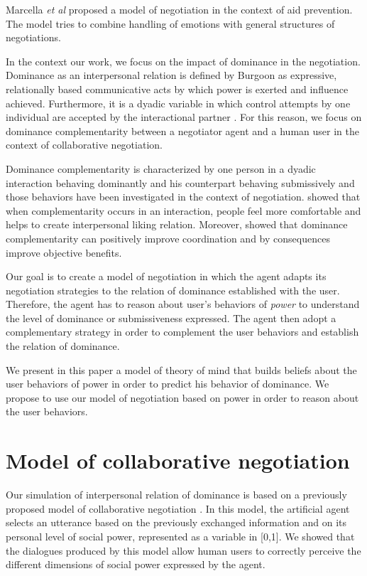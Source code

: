 \documentclass[sigconf]{aamas}  %
\begin{document}
	Marcella \textit{et al} \cite{klatt2011negotiations} proposed a model of negotiation in the context of aid prevention. The model tries to combine handling of emotions with general structures of negotiations. 
	
	In the context our work, we focus on the impact of dominance in the negotiation. Dominance as an interpersonal relation is defined by Burgoon \cite{burgoon1998nature} as expressive, relationally based communicative acts by which power is exerted and influence achieved. Furthermore, it is a dyadic variable in which control attempts by one individual are accepted by the
	interactional partner \cite{dunbar2005perceptions}. For this reason, we focus on dominance complementarity between a negotiator agent and a human user in the context of collaborative negotiation. 
	
	Dominance complementarity is characterized by one person in a dyadic interaction behaving dominantly and his counterpart behaving submissively \cite{tiedens2003power} and those behaviors have been investigated in the context of negotiation. \cite{tiedens2003power} showed that when complementarity occurs in an interaction, people feel more comfortable and helps to create interpersonal liking relation.
	Moreover, \cite{wiltermuth2015benefits} showed that dominance complementarity can positively improve coordination and by consequences improve objective benefits.
	
	Our goal is to create a model of negotiation in which the agent adapts its negotiation strategies to the relation of dominance established with the user. Therefore, the agent has to reason about user's behaviors of \emph{power} to understand the level of dominance or submissiveness expressed. The agent then adopt a complementary strategy in order to complement the user behaviors and establish the relation of dominance.
	
	We present in this paper a model of theory of mind that builds beliefs about the user behaviors of power in order to predict his behavior of dominance. We propose to use our model of negotiation based on power in order to reason about the user behaviors. 


\section{Model of collaborative negotiation}
	
	Our simulation of interpersonal relation of dominance is based on a previously proposed model of collaborative negotiation \cite{ouali2017computational}. In this model, the artificial agent selects an utterance based on the previously exchanged information and on its personal level of social power, represented as a variable in [0,1]. We showed that the dialogues produced by this model allow human users to correctly perceive the different dimensions of social power expressed by the agent.
	
\end{document}
